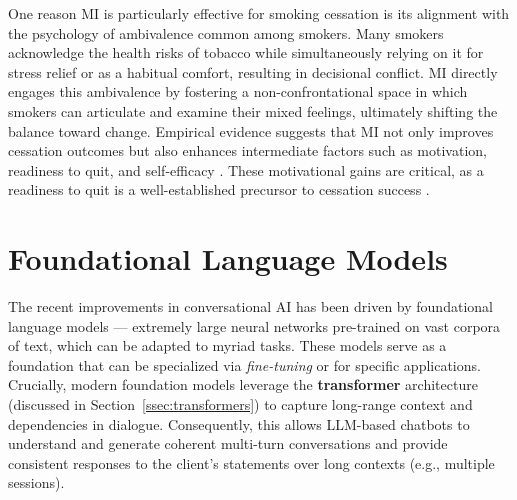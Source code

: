 One reason MI is particularly effective for smoking cessation is its alignment with the psychology of ambivalence common among smokers. Many smokers acknowledge the health risks of tobacco while simultaneously relying on it for stress relief or as a habitual comfort, resulting in decisional conflict. MI directly engages this ambivalence by fostering a non-confrontational space in which smokers can articulate and examine their mixed feelings, ultimately shifting the balance toward change. Empirical evidence suggests that MI not only improves cessation outcomes but also enhances intermediate factors such as motivation, readiness to quit, and self-efficacy \cite{Boudreaux2012, Hettema2005}. These motivational gains are critical, as a readiness to quit is a well-established precursor to cessation success \cite{West2006}.




\section{Foundational Language Models} \label{sec:foundational_models}
The recent improvements in conversational AI has been driven by foundational language models \cite{stanfordCRFM2021} --- extremely large neural networks pre-trained on vast corpora of text, which can be adapted to myriad tasks. These models serve as a foundation that can be specialized via \emph{fine-tuning} or for specific applications. Crucially, modern foundation models leverage the \textbf{transformer} architecture (discussed in Section~\ref{ssec:transformers}) to capture long-range context and dependencies in dialogue. Consequently, this allows LLM-based chatbots to understand and generate coherent multi-turn conversations and provide consistent responses to the client's statements over long contexts (e.g., multiple sessions).

